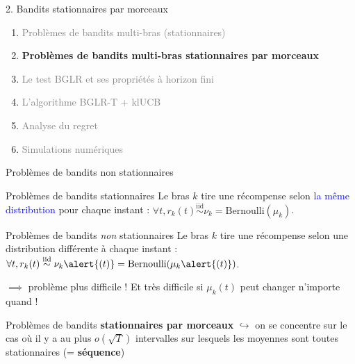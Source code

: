 \documentclass[11pt,french,ignorenonframetext,]{beamer}
\begin{document}
\begin{frame}{2. Bandits stationnaires par morceaux}

  \begin{enumerate}
    \item
    \textcolor{gray}{
      Problèmes de bandits multi-bras (stationnaires)
    }
    \vspace*{15pt}

    \item
    \alert{\textbf{%
      Problèmes de bandits multi-bras stationnaires par morceaux
    }}
    \vspace*{15pt}

    \item
    \textcolor{gray}{
      Le test BGLR et ses propriétés à horizon fini
    }
    \vspace*{15pt}

    \item
    \textcolor{gray}{
      L'algorithme BGLR-T + klUCB
    }
    \vspace*{15pt}

    \item
    \textcolor{gray}{
      Analyse du regret
    }
    \vspace*{15pt}

    \item
    \textcolor{gray}{
      Simulations numériques
    }
  \end{enumerate}

\end{frame}


\begin{frame}{Problèmes de bandits non stationnaires}

  \begin{block}{Problèmes de bandits stationnaires}
    Le bras $k$ tire une récompense selon \textcolor{blue}{la même distribution} pour chaque instant :
    $\forall t, r_k(t) \overset{\text{iid}}{\sim} \nu_k = \mathrm{Bernoulli}(\mu_k)$.
  \end{block}

  \pause
  \begin{alertblock}{Problèmes de bandits \emph{non} stationnaires}
    Le bras $k$ tire une récompense selon \alert{une distribution différente à chaque instant} :
    $\forall t, r_k(t) \overset{\text{iid}}{\sim} \nu_k\alert{(t)} = \mathrm{Bernoulli}(\mu_k\alert{(t)})$.
  \end{alertblock}

  $\implies$ \dXey{} problème plus difficile !
  Et très difficile si $\mu_k(t)$ peut changer n'importe quand !

  \pause
  \begin{block}{Problèmes de bandits \textbf{stationnaires par morceaux}}
    $\hookrightarrow$ on se concentre sur le cas où il y a au plus $o(\sqrt{T})$ intervalles sur lesquels les moyennes sont toutes stationnaires (= \textbf{séquence})
  \end{block}
\end{frame}
\end{document}
